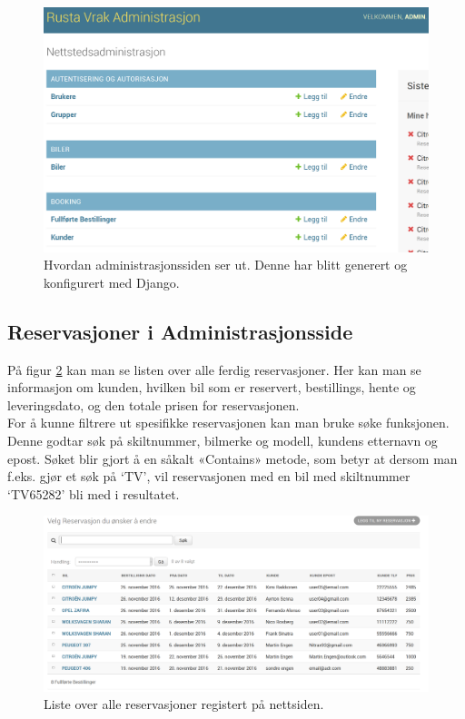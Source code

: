  \begin{figure}[htbp]
	\centering
		\includegraphics[scale=0.3]{Bilder/admin_forside.png}
	\caption[Forside i Administrasjons Side]{Hvordan administrasjonssiden ser ut. Denne har blitt generert og konfigurert med Django. } %
	\label{fig:admin_front}
\end{figure}
\newpage
\subsection{Reservasjoner i Administrasjonsside}
På figur \ref{fig:admin_list} kan man se listen over alle ferdig reservasjoner. Her kan man se informasjon om kunden, hvilken bil som er reservert, bestillings, hente og leveringsdato, og den totale prisen for reservasjonen. \\
For å kunne filtrere ut spesifikke reservasjonen kan man bruke søke funksjonen. Denne godtar søk på skiltnummer, bilmerke og modell, kundens etternavn og epost. Søket blir gjort å en såkalt «Contains» metode, som betyr at dersom man f.eks. gjør et søk på ‘TV’, vil reservasjonen med en bil med skiltnummer ‘TV65282’ bli med i resultatet.

 \begin{figure}[htbp]
	\centering
		\includegraphics[width=16cm, keepaspectratio]{Bilder/admin_liste2.png}
	\caption[Administrasjonsside - Oversikt over reservasjoner]{Liste over alle reservasjoner registert på nettsiden. } %
	\label{fig:admin_list}
\end{figure}





